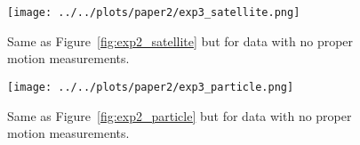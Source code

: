 \documentclass[letterpaper,12pt,preprint]{aastex}
\begin{document}
\begin{figure}[!ht]
\begin{center}
\texttt{[image: ../../plots/paper2/exp3\_satellite.png]}
\caption{ Same as Figure~\ref{fig:exp2_satellite} but for data with no proper motion measurements.  }\label{fig:exp3_satellite}
\end{center}
\end{figure}

\begin{figure}[!ht]
\begin{center}
\texttt{[image: ../../plots/paper2/exp3\_particle.png]}
\caption{ Same as Figure~\ref{fig:exp2_particle} but for data with no proper motion measurements.  }\label{fig:exp3_particle}
\end{center}
\end{figure}
\end{document}
